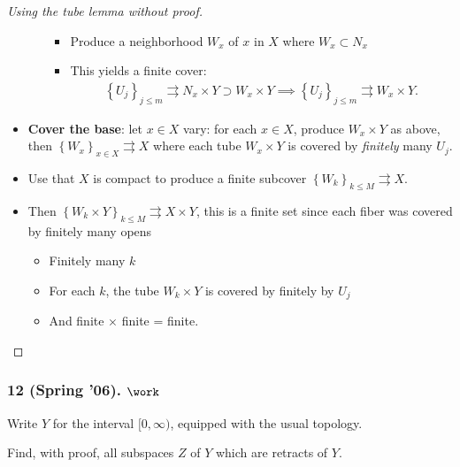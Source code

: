 \begin{solution}
\begin{proof}[Using the tube lemma without proof]
\begin{itemize}
\begin{itemize}
    \begin{itemize}
    \tightlist
    \item
      Produce a neighborhood \(W_x\) of \(x\) in \(X\) where
      \(W_x \subset N_x\)
    \item
      This yields a finite cover:
      \begin{align*}
      \left\{{U_j}\right\}_{j\leq m}\rightrightarrows N_x \times Y \supset W_x \times Y \implies \left\{{U_j}\right\}_{j\leq m} \rightrightarrows W_x\times Y
      .\end{align*}
    \end{itemize}
  \end{itemize}
\item
  \textbf{Cover the base}: let \(x\in X\) vary: for each \(x\in X\),
  produce \(W_x \times Y\) as above, then
  \(\left\{{W_x}\right\}_{x\in X} \rightrightarrows X\) where each tube
  \(W_x \times Y\) is covered by \emph{finitely} many \(U_j\).
\item
  Use that \(X\) is compact to produce a finite subcover
  \(\left\{{W_k}\right\}_{k \leq M} \rightrightarrows X\).
\item
  Then
  \(\left\{{W_k\times Y}\right\}_{k\leq M} \rightrightarrows X\times Y\),
  this is a finite set since each fiber was covered by finitely many
  opens

  \begin{itemize}
  \tightlist
  \item
    Finitely many \(k\)
  \item
    For each \(k\), the tube \(W_k \times Y\) is covered by finitely by
    \(U_j\)
  \item
    And finite \(\times\) finite = finite.
  \end{itemize}
\end{itemize}

\end{proof}

\end{solution}

\hypertarget{spring-06.-work}{%
\subsubsection{\texorpdfstring{12 (Spring '06).
\(\work\)}{12 (Spring '06). \textbackslash work}}\label{spring-06.-work}}

\begin{problem}[Spring 2006, 12]

Write \(Y\) for the interval \([0, \infty)\), equipped with the usual
topology.

Find, with proof, all subspaces \(Z\) of \(Y\) which are retracts of
\(Y\).

\end{problem}

